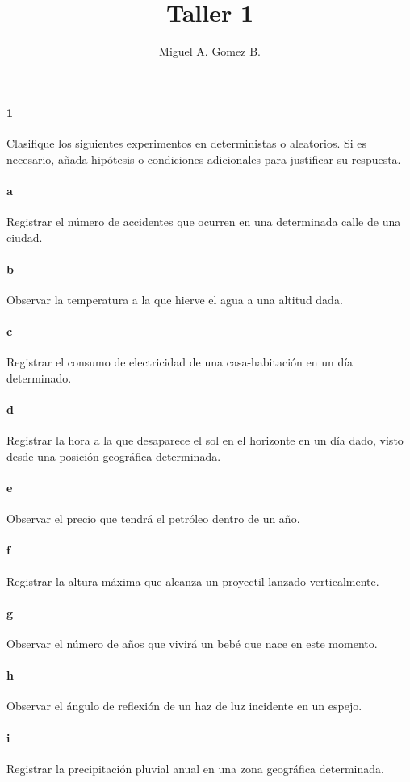\documentclass{article}
\title{Taller 1}
\author{Miguel A. Gomez B.}
\begin{document}
	\maketitle
\paragraph{1} Clasifique los siguientes experimentos en deterministas o aleatorios. Si es necesario, añada hipótesis o condiciones adicionales para justificar su respuesta.
\paragraph{a} Registrar el número de accidentes que ocurren en una determinada calle de una ciudad.
\paragraph{b} Observar la temperatura a la que hierve el agua a una altitud dada.
\paragraph{c} Registrar el consumo de electricidad de una casa-habitación en un día determinado.
\paragraph{d}Registrar la hora a la que desaparece el sol en el horizonte en un día dado, visto desde una posición geográfica determinada.
\paragraph{e} Observar el precio que tendrá el petróleo dentro de un año.
\paragraph{f} Registrar la altura máxima que alcanza un proyectil lanzado verticalmente.
\paragraph{g} Observar el número de años que vivirá un bebé que nace en este momento.
\paragraph{h} Observar el ángulo de reflexión de un haz de luz incidente en un espejo.
\paragraph{i} Registrar la precipitación pluvial anual en una zona geográfica determinada.
\end{document}
